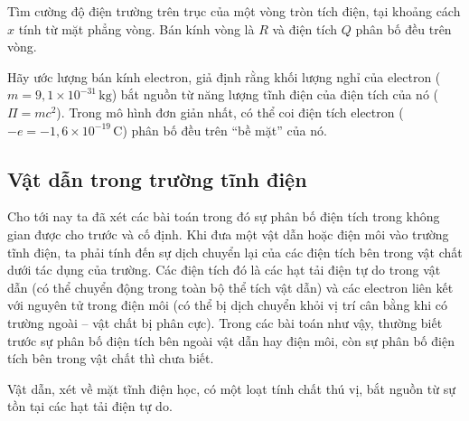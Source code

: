 
 Tìm cường độ điện trường trên trục của một vòng tròn tích điện, tại khoảng cách $x$ tính từ mặt phẳng vòng. Bán kính vòng là $R$ và điện tích $Q$ phân bố đều trên vòng.


 Hãy ước lượng bán kính electron, giả định rằng khối lượng nghỉ của electron ($m=9{,}1\times10^{-31}\,\mathrm{kg}$) bắt nguồn từ năng lượng tĩnh điện của điện tích của nó ($\Pi = mc^2$). Trong mô hình đơn giản nhất, có thể coi điện tích electron ($-e=-1{,}6\times10^{-19}\,\mathrm{C}$) phân bố đều trên ``bề mặt'' của nó.


\subsection{Vật dẫn trong trường tĩnh điện}

Cho tới nay ta đã xét các bài toán trong đó sự phân bố điện tích trong không gian được cho trước và cố định. Khi đưa một vật dẫn hoặc điện môi vào trường tĩnh điện, ta phải tính đến sự dịch chuyển lại của các điện tích bên trong vật chất dưới tác dụng của trường. Các điện tích đó là các hạt tải điện tự do trong vật dẫn (có thể chuyển động trong toàn bộ thể tích vật dẫn) và các electron liên kết với nguyên tử trong điện môi (có thể bị dịch chuyển khỏi vị trí cân bằng khi có trường ngoài -- vật chất bị phân cực). Trong các bài toán như vậy, thường biết trước sự phân bố điện tích bên ngoài vật dẫn hay điện môi, còn sự phân bố điện tích bên trong vật chất thì chưa biết.

Vật dẫn, xét về mặt tĩnh điện học, có một loạt tính chất thú vị, bắt nguồn từ sự tồn tại các hạt tải điện tự do.

